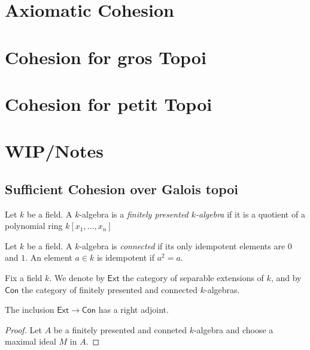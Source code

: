\section{Axiomatic Cohesion}
\section{Cohesion for gros Topoi}
\section{Cohesion for petit Topoi}
\section{WIP/Notes}

\subsection{Sufficient Cohesion over Galois topoi}
\begin{definition}
  Let $k$ be a field. A $k$-algebra is a \textit{finitely presented $k$-algebra} if it is a quotient of a polynomial ring $k[x_1, \dots, x_n]$
\end{definition}

\begin{definition}
  Let $k$ be a field. A $k$-algebra is \textit{connected} if its only idempotent elements are $0$ and $1$. An element $a \in k$ is idempotent if $a^2 = a$.
\end{definition}
Fix a field $k$.  We denote by $\mathsf{Ext}$ the category of separable extensions of $k$, and by $\mathsf{Con}$ the category of finitely presented and connected $k$-algebras.

\begin{lemma}
  The inclusion $\mathsf{Ext} \longrightarrow \mathsf{Con}$ has a right adjoint.
\end{lemma}

\begin{proof}
  Let $A$ be a finitely presented and conneted $k$-algebra and choose a maximal ideal $M$ in $A$. 
\end{proof}